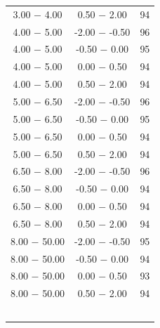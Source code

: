 \documentclass[abstract = on,listof=totoc, bibliography=totoc]{scrreprt}
\begin{document}
\begin{table}[!h]
\begin{minipage}[t]{.33\linewidth}
\begin{tabular}[t]{ccc}
3.00 $-$ 4.00 & 0.50 $-$ 2.00 & 94\\
4.00 $-$ 5.00 & -2.00 $-$ -0.50 & 96\\
4.00 $-$ 5.00 & -0.50 $-$ 0.00 & 95\\
4.00 $-$ 5.00 & 0.00 $-$ 0.50 & 94\\
4.00 $-$ 5.00 & 0.50 $-$ 2.00 & 94\\
5.00 $-$ 6.50 & -2.00 $-$ -0.50 & 96\\
5.00 $-$ 6.50 & -0.50 $-$ 0.00 & 95\\
5.00 $-$ 6.50 & 0.00 $-$ 0.50 & 94\\
5.00 $-$ 6.50 & 0.50 $-$ 2.00 & 94\\
6.50 $-$ 8.00 & -2.00 $-$ -0.50 & 96\\
6.50 $-$ 8.00 & -0.50 $-$ 0.00 & 94\\
6.50 $-$ 8.00 & 0.00 $-$ 0.50 & 94\\
6.50 $-$ 8.00 & 0.50 $-$ 2.00 & 94\\
8.00 $-$ 50.00 & -2.00 $-$ -0.50 & 95\\
8.00 $-$ 50.00 & -0.50 $-$ 0.00 & 94\\
8.00 $-$ 50.00 & 0.00 $-$ 0.50 & 93\\
8.00 $-$ 50.00 & 0.50 $-$ 2.00 & 94\\
\\
\\
\\
\\
\\		
		\hline
		\end{tabular}
	\end{minipage}
\end{table}
\end{document}
